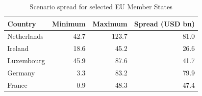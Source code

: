 \begin{table}[H]
\centering
\caption{Scenario spread for selected EU Member States}
\label{tab:stage4_6_country_spread_generated}
\small
\begin{tabular}{@{}lrrr@{}}
\toprule
Country & Minimum & Maximum & Spread (USD bn) \\
\midrule
Netherlands & 42.7 & 123.7 & 81.0 \\
Ireland & 18.6 & 45.2 & 26.6 \\
Luxembourg & 45.9 & 87.6 & 41.7 \\
Germany & 3.3 & 83.2 & 79.9 \\
France & 0.9 & 48.3 & 47.4 \\
\bottomrule
\end{tabular}
\end{table}
